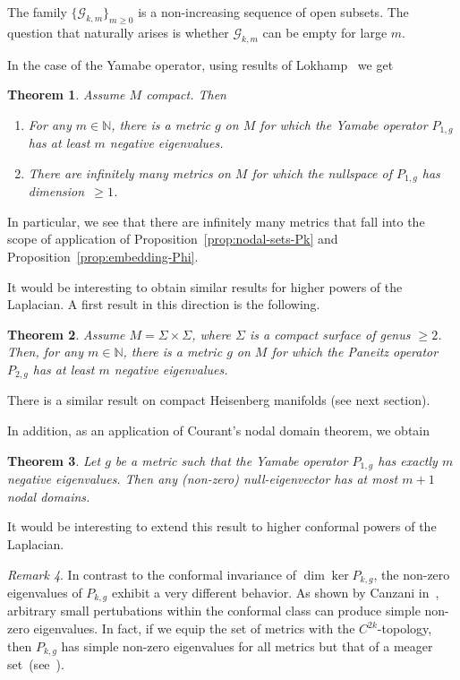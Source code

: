 \documentclass{amsart}
\newtheorem{theorem}{Theorem}[section]
\theoremstyle{definition}
\theoremstyle{remark}
\newtheorem{remark}[theorem]{Remark}
\begin{document}
The family $\{{{\mathcal{G}}}_{k,m}\}_{m\geq 0}$ is a non-increasing sequence of open subsets. The question 
that naturally arises 
is whether ${{\mathcal{G}}}_{k,m}$ can be empty for large $m$. 

In the case of the Yamabe operator, using results of
Lokhamp~\cite{Lo96} we get

\begin{theorem}\label{neg:eig:large}  Assume $M$ compact. Then
   \begin{enumerate}
       \item  For any $m\in {\mathbb{N}}$, there is a metric $g$ on $M$ for which the Yamabe operator 
$P_{1,g}$ has at least $m$ negative eigenvalues. 
     \item There are infinitely many metrics on $M$ for which the
       nullspace of $P_{1,g}$ has dimension~$\geq 1$.
   \end{enumerate}
\end{theorem}

In particular, we see that there are infinitely many metrics that fall into the scope of application of Proposition~\ref{prop:nodal-sets-Pk} and
Proposition~\ref{prop:embedding-Phi}.

It would be interesting to obtain similar results for higher powers of the Laplacian. 
A first result in this direction 
is the following.

\begin{theorem}
Assume $M=\Sigma \times \Sigma$, where $\Sigma$ is a compact surface of genus $\geq 2$. 
Then, for any $m\in {\mathbb{N}}$, there is
a metric $g$ on $M$ for which the Paneitz operator $P_{2,g}$ has at least $m$ negative 
eigenvalues. 
\end{theorem}
There is a similar result on compact Heisenberg manifolds (see next section). 

In addition, as an application of Courant's nodal domain theorem, we obtain 
\begin{theorem}\label{number:nodal}
Let $g$ be a metric such that the Yamabe operator $P_{1,g}$ has exactly $m$ negative 
eigenvalues. Then any (non-zero) 
null-eigenvector has at most $m+1$ nodal domains.  
\end{theorem}

It would be interesting to extend this result to higher conformal powers of the Laplacian.  

\begin{remark}
In contrast to the conformal invariance of $\dim \ker P_{k,g}$, the
non-zero eigenvalues of $P_{k,g}$ exhibit a very different
behavior. As shown by Canzani in~\cite{Ca}, arbitrary small
pertubations within the conformal class can produce simple non-zero
eigenvalues. In fact, if we equip the set of metrics with the
$C^{2k}$-topology, then $P_{k,g}$ has simple non-zero eigenvalues for
all metrics but that of a meager set~(see~\cite{Ca}).
\end{remark}
\end{document}
